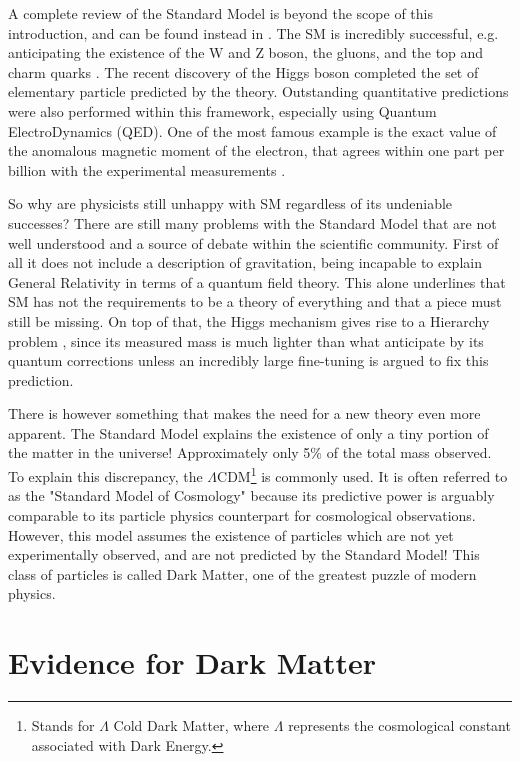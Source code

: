 A complete review of the Standard Model is beyond the scope of this introduction, and can be found instead in \cite{review-particle-physics}. The SM is incredibly successful, e.g. anticipating the existence of the W and Z boson, the gluons, and the top and charm quarks \cite{Woithe_2017}. The recent discovery of the Higgs boson \cite{Aad:2012tfa} completed the set of elementary particle predicted by the theory. Outstanding quantitative predictions were also performed within this framework, especially using Quantum ElectroDynamics (QED).  One of the most famous example is the exact value of the anomalous magnetic moment of the electron, that agrees within one part per billion with the experimental measurements \cite{Mohr:2015ccw}.

So why are physicists still unhappy with SM regardless of its undeniable successes? There are still many problems with the Standard Model that are not well understood and a source of debate within the scientific community. First of all it does not include a description of gravitation, being incapable to explain General Relativity in terms of a quantum field theory. This alone underlines that SM has not the requirements to be a theory of everything and that a piece must still be missing. On top of that, the Higgs mechanism gives rise to a Hierarchy problem \cite{review-particle-physics}, since its measured mass is much lighter than what anticipate by its quantum corrections unless an incredibly large fine-tuning is argued to fix this prediction.

There is however something that makes the need for a new theory even more apparent. The Standard Model explains the existence of only a tiny portion of the matter in the universe! Approximately only 5\% of the total mass observed. To explain this discrepancy, the $\Lambda$CDM\footnote{Stands for $\Lambda$ Cold Dark Matter, where $\Lambda$ represents the cosmological constant associated with Dark Energy.} is commonly used.  It is often referred to as the "Standard Model of Cosmology" because its predictive power is arguably comparable to its particle physics counterpart for cosmological observations. However, this model assumes the existence of particles which are not yet experimentally observed, and are not predicted by the Standard Model! This class of particles is called Dark Matter, one of the greatest puzzle of modern physics.

\section{Evidence for Dark Matter}
\label{ch1:sec:dm-evidence}

